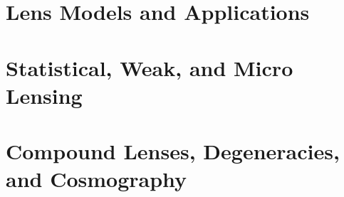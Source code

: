 \documentclass[12pt,letterpaper,twoside]{report}
\newif\ifsolutions
\begin{document}

\ifsolutions\fi

\part{Lens Models and Applications}


\ifsolutions\fi


\ifsolutions\fi

\ifsolutions\fi


\ifsolutions\fi

\part{Statistical, Weak, and Micro Lensing}


\ifsolutions\fi


\ifsolutions\fi


\ifsolutions\fi

\part{Compound Lenses, Degeneracies, and Cosmography}
\end{document}
